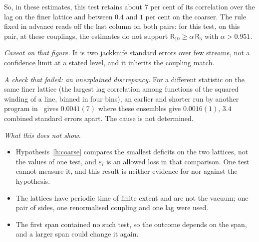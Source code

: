So, in these estimates, this test retains about $7$ per cent of its correlation over the lag on the finer lattice and between
$0.4$ and $1$ per cent on the coarser. The rule fixed in advance reads off the last column on both pairs: for
this test, on this pair, at these couplings, the estimates do not support
$\mathsf R_{10}\ge\alpha\,\mathsf R_5$ with $\alpha>0.951$.

\emph{Caveat on that figure.} It is two jackknife standard errors over few streams, not a confidence limit at
a stated level, and it inherits the coupling match.

\emph{A check that failed: an unexplained discrepancy.} For a different statistic on the same finer lattice (the largest lag correlation among functions of the
squared winding of a line, binned in four bins),
an earlier and shorter run by another program in~\cite{RepoData} gives $0.0041(7)$ where these ensembles give
$0.0016(1)$, $3.4$ combined standard errors apart. The cause is not determined.

\emph{What this does not show.}
\begin{itemize}
\item Hypothesis~\ref{h:coarse} compares the smallest deficits on the two lattices, not the values of one
test, and $\varepsilon_i$ is an allowed loss in that comparison. One test cannot measure it, and this result
is neither evidence for nor against the hypothesis.
\item The lattices have periodic time of finite extent and are not the vacuum; one pair of sides, one
renormalised coupling and one lag were used.
\item The first span contained no such test, so the outcome depends on the span, and a larger span could
change it again.
\end{itemize}

